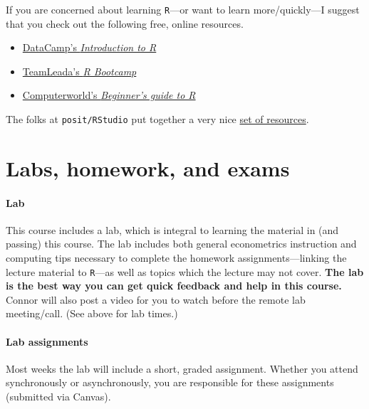 \documentclass[10pt]{article}
\begin{document}
If you are concerned about learning \texttt{R}---or want to learn more/quickly---I suggest that you check out the following free, online resources.
\begin{itemize}
  \item \href{https://www.datacamp.com/courses/free-introduction-to-r}{DataCamp's \textit{Introduction to R}}
  \item \href{https://www.teamleada.com/courses/r-bootcamp}{TeamLeada's \textit{R Bootcamp}}
  \item \href{https://www.computerworld.com/article/2497143/business-intelligence-beginner-s-guide-to-r-introduction.html}{Computerworld's \textit{Beginner's guide to R}}
\end{itemize}
The folks at \texttt{posit/RStudio} put together a very nice \href{https://education.rstudio.com/learn/beginner/}{set of resources}.

\section*{Labs, homework, and exams}

\paragraph{Lab} This course includes a lab, which is integral to learning the material in (and passing) this course. The lab includes both general econometrics instruction and computing tips necessary to complete the homework assignments---linking the lecture material to \texttt{R}---as well as topics which the lecture may not cover. \textbf{The lab is the best way you can get quick feedback and help in this course.} Connor will also post a video for you to watch before the remote lab meeting/call. (See above for lab times.)

\paragraph{Lab assignments} Most weeks the lab will include a short, graded assignment. Whether you attend synchronously or asynchronously, you are responsible for these assignments (submitted via Canvas).
\end{document}

